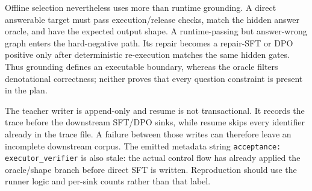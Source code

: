 Offline selection nevertheless uses more than runtime grounding.  A direct answerable target must
pass execution/release checks, match the hidden answer oracle, and have the expected output shape.
A runtime-passing but answer-wrong graph enters the hard-negative path.  Its repair becomes a
repair-SFT or DPO positive only after deterministic re-execution matches the same hidden gates.
Thus grounding defines an executable boundary, whereas the oracle filters denotational correctness;
neither proves that every question constraint is present in the plan.

The teacher writer is append-only and resume is not transactional.  It records the trace before
the downstream SFT/DPO sinks, while resume skips every identifier already in the trace file.  A
failure between those writes can therefore leave an incomplete downstream corpus.  The emitted
metadata string \texttt{acceptance: executor\_verifier} is also stale: the actual control flow has
already applied the oracle/shape branch before direct SFT is written.  Reproduction should use the
runner logic and per-sink counts rather than that label.
